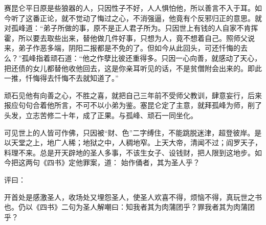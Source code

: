 \documentclass[a4paper,12pt,UTF8,twoside]{ctexbook}
\begin{document}
赛昆仑平日原是些狼器的人，只因性子不好，人人惧怕他，所以善言不入于耳。如今听了这番正论，就不觉动了悔过之心，不消强逼，他竟有个反邪归正的意思。就对孤峰道：“弟子所做的事，原不是正人君子所为。只因世上有钱的人自家不肯挥霍，所以要去取些出来，替他做几件好事，只想为人，竟不想着自己。照师父说来，弟子作恶多端，阴阳二报都是不免的了。但如今从此回头，可还忏悔的去么？”孤峰指着顽石道：“他之作孽比彼还重得多。只因一心向善，就感动了天心，把还债的女儿都替他收他回去，这是你亲耳听见的话，不是贫僧附会出来的。即此一推，忏悔得去忏悔不去就知道了。”

顽石见他有向善之心，不胜之喜，就把自己三年前不受师父教训，肆意妄行，后来报应句句合着他所言，不可不以小弟为鉴。塞昆仑定了主意，就拜孤峰为师，削了头发，立志苦修二十年，成了正果。与孤峰、顽石一同坐化。

可见世上的人皆可作佛，只因被“财、色”二字缚住，不能跳脱迷津，超登彼岸。是以天堂之上，地广人稀；地狱之中，人稠地窄。上天大帝，清闻不过；阎罗天子，料理不来。总是开天辟地的圣人多事，不该生女子、设钱财，把人限到这地步。如今把这两句《四书》定他罪案，道： 始作俑者，其为圣人乎？

评曰：

开首处是感激圣人，收场处又埋怨圣人，使圣人欢喜不得，烦恼不得，真玩世之书也。仍以《四书》二句为圣人解嘲曰：知我者其为肉蒲团乎？罪我者其为肉蒲团乎？

\backmatter
\end{document}
